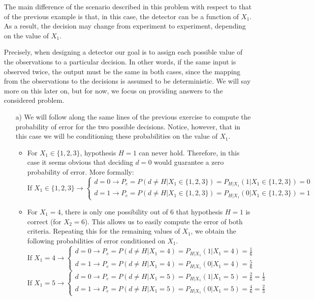 \begin{solution}
The main difference of the scenario described in this problem with respect to that of the previous example is that, in this case, the detector can be a function of $X_1$. As a result, the decision may change from experiment to experiment, depending on the value of  $X_1$.

Precisely, when designing a detector our goal is to assign each possible value of the observations to a particular decision. In other words, if the same input is observed twice, the output must be the same in both cases, since the mapping from the observations to the decisions is assumed to be deterministic. We will say more on this later on, but for now, we focus on providing answers to the considered problem.

\begin{itemize}
    \item [a)] We will follow along the same lines of the previous exercise to compute the probability of error for the two possible decisions. Notice, however, that in this case we will be conditioning these probabilities on the value of $X_1$.
    \begin{itemize}
        \item For $X_1 \in \{1,2,3\}$, hypothesis $H=1$ can never hold. Therefore, in this case it seems obvious that deciding $d=0$ would guarantee a zero probability of error. More formally:
        $$\text{If } X_1 \in \{1,2,3\} \rightarrow \left\{\begin{array}{l} d=0 \rightarrow P_e = P(d\neq H|X_1\in \{1,2,3\}) = P_{H|X_1}(1|X_1\in \{1,2,3\}) = 0 \\ d=1 \rightarrow P_e = P(d\neq H|X_1\in \{1,2,3\}) = P_{H|X_1}(0|X_1\in \{1,2,3\}) = 1\end{array}\right.$$
        \item For $X_1 = 4$, there is only one possibility out of 6 that hypothesis $H=1$ is correct (for $X_2=6$). This allows us to easily compute the error of both criteria. Repeating this  for the remaining values of $X_1$, we obtain the following probabilities of error conditioned on $X_1$.
        $$\text{If } X_1 =4 \rightarrow \left\{\begin{array}{l} d=0 \rightarrow P_e = P(d\neq H|X_1=4) = P_{H|X_1}(1|X_1=4) = \frac{1}{6} \\ d=1 \rightarrow P_e = P(d\neq H|X_1=4) = P_{H|X_1}(0|X_1=4) = \frac{5}{6}\end{array}\right.$$
        $$\text{If } X_1 =5 \rightarrow \left\{\begin{array}{l} d=0 \rightarrow P_e = P(d\neq H|X_1=5) = P_{H|X_1}(1|X_1=5) = \frac{2}{6} = \frac{1}{3}\\ d=1 \rightarrow P_e = P(d\neq H|X_1=5) = P_{H|X_1}(0|X_1=5) = \frac{4}{6} = \frac{2}{3}\end{array}\right.$$

\end{itemize}
\end{itemize}
\end{solution}
